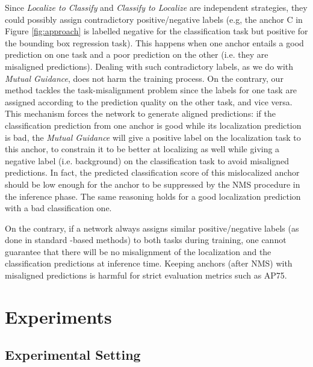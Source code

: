 \documentclass[runningheads]{llncs}
\begin{document}
Since \emph{Localize to Classify} and \emph{Classify to Localize} are independent strategies, they could possibly assign contradictory positive/negative labels (e.g, the anchor C in Figure \ref{fig:approach} is labelled negative for the classification task but positive for the bounding box regression task). This happens when one anchor entails a good prediction on one task and a poor prediction on the other (i.e. they are misaligned predictions). Dealing with such contradictory labels, as we do with \emph{Mutual Guidance}, does not harm the training process. On the contrary, our method tackles the task-misalignment problem since the labels for one task are assigned according to the prediction quality on the other task, and vice versa. This mechanism forces the network to generate aligned predictions: if the classification prediction from one anchor is good while its localization prediction is bad, the \emph{Mutual Guidance} will give a positive label on the localization task to this anchor, to constrain it to be better at localizing as well while giving a negative label (i.e. background) on the classification task to avoid misaligned predictions.
In fact, the predicted classification score of this mislocalized anchor should be low enough for the anchor to be suppressed by the NMS procedure in the inference phase. The same reasoning holds for a good localization prediction with a bad classification one.

On the contrary, if a network always assigns similar positive/negative labels (as done in standard -based methods) to both tasks during training, one cannot guarantee that there will be no misalignment of the localization and the classification predictions at inference time. 
Keeping anchors (after NMS) with misaligned predictions is harmful for strict evaluation metrics such as AP75.
\section{Experiments}
\label{sec:expe}

\subsection{Experimental Setting}
\end{document}
